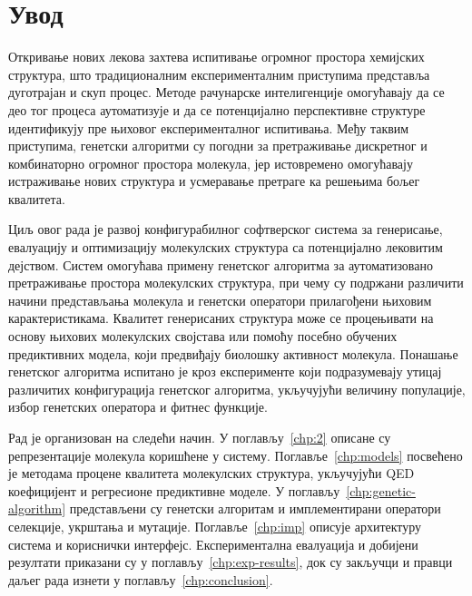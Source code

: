 \documentclass[12pt,oneside]{memoir}
\begin{document}
\frontmatter
\naslovna
\komisija
\apstrakt
\tableofcontents*

\mainmatter

\chapter{Увод}

Откривање нових лекова захтева испитивање огромног простора хемијских 
структура, што традиционалним експерименталним приступима представља 
дуготрајан и скуп процес. Методе рачунарске интелигенције омогућавају 
да се део тог процеса аутоматизује и да се потенцијално перспективне 
структуре идентификују пре њиховог експерименталног испитивања. Међу 
таквим приступима, генетски алгоритми су погодни за претраживање 
дискретног и комбинаторно огромног простора молекула, јер истовремено 
омогућавају истраживање нових структура и усмеравање претраге ка решењима 
бољег квалитета.

Циљ овог рада је развој конфигурабилног софтверског система за генерисање, 
евалуацију и оптимизацију молекулских структура са потенцијално лековитим 
дејством. Систем омогућава примену генетског алгоритма за аутоматизовано 
претраживање простора молекулских структура, при чему су подржани 
различити начини представљања молекула и генетски оператори прилагођени 
њиховим карактеристикама. Квалитет генерисаних структура може се 
процењивати на основу њихових молекулских својстава или помоћу посебно обучених 
предиктивних модела, који предвиђају биолошку активност молекула.
Понашање генетског алгоритма испитано је кроз експерименте који подразумевају
утицај различитих конфигурација генетског алгоритма, укључујући величину 
популације, избор генетских оператора и фитнес функције.


Рад је организован на следећи начин. У поглављу~\ref{chp:2} описане су 
репрезентације молекула коришћене у систему. Поглавље~\ref{chp:models} 
посвећено је методама процене квалитета молекулских структура, укључујући 
QED коефицијент и регресионе предиктивне моделе. У 
поглављу~\ref{chp:genetic-algorithm} представљени су генетски алгоритам 
и имплементирани оператори селекције, укрштања и мутације. 
Поглавље~\ref{chp:imp} описује архитектуру система и кориснички 
интерфејс. Експериментална евалуација и добијени резултати приказани су 
у поглављу~\ref{chp:exp-results}, док су закључци и правци даљег рада 
изнети у поглављу~\ref{chp:conclusion}.
\end{document}
